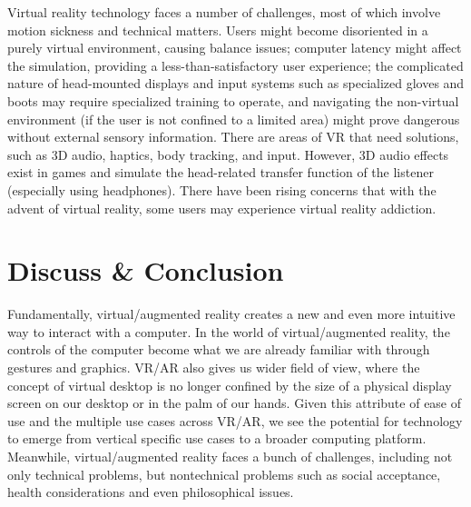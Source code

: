 \documentclass[preprint,12pt]{elsarticle}
\begin{document}


Virtual reality technology faces a number of challenges, most of which involve motion sickness and technical matters. Users might become disoriented in a purely virtual environment, causing balance issues; computer latency might affect the simulation, providing a less-than-satisfactory user experience; the complicated nature of head-mounted displays and input systems such as specialized gloves and boots may require specialized training to operate, and navigating the non-virtual environment (if the user is not confined to a limited area) might prove dangerous without external sensory information. There are areas of VR that need solutions, such as 3D audio, haptics, body tracking, and input. However, 3D audio effects exist in games and simulate the head-related transfer function of the listener (especially using headphones). There have been rising concerns that with the advent of virtual reality, some users may experience virtual reality addiction.

\section{Discuss \& Conclusion}

Fundamentally, virtual/augmented reality creates a new and even more intuitive way to interact with a computer. In the world of virtual/augmented reality, the controls of the computer become what we are already familiar with through gestures and graphics. VR/AR also gives us wider field of view, where the concept of virtual desktop is no longer confined by the size of a physical display screen on our desktop or in the palm of our hands. Given this attribute of ease of use and the multiple use cases across VR/AR, we see the potential for technology to emerge from vertical specific use cases to a broader computing platform. Meanwhile, virtual/augmented reality faces a bunch of challenges, including not only technical problems, but nontechnical problems such as social acceptance, health considerations and even philosophical issues.
\end{document}
